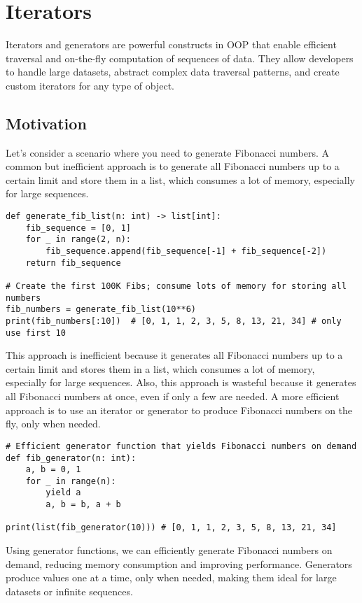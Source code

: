 \documentclass[oneside,11pt,dvipsnames]{book}
\begin{document}
\chapter{Iterators}
Iterators and generators are powerful constructs in OOP that enable efficient traversal and on-the-fly computation of sequences of data. They allow developers to handle large datasets, abstract complex data traversal patterns, and create custom iterators for any type of object. 

\section{Motivation}
Let’s consider a scenario where you need to generate Fibonacci numbers. A common but inefficient approach is to generate all Fibonacci numbers up to a certain limit and store them in a list, which consumes a lot of memory, especially for large sequences.

\begin{lstlisting}
def generate_fib_list(n: int) -> list[int]:
    fib_sequence = [0, 1]
    for _ in range(2, n):
        fib_sequence.append(fib_sequence[-1] + fib_sequence[-2])
    return fib_sequence

# Create the first 100K Fibs; consume lots of memory for storing all numbers
fib_numbers = generate_fib_list(10**6)  
print(fib_numbers[:10])  # [0, 1, 1, 2, 3, 5, 8, 13, 21, 34] # only use first 10
\end{lstlisting}

This approach is inefficient because it generates all Fibonacci numbers up to a certain limit and stores them in a list, which consumes a lot of memory, especially for large sequences. Also, this approach is wasteful because it generates all Fibonacci numbers at once, even if only a few are needed.
A more efficient approach is to use an iterator or generator to produce Fibonacci numbers on the fly, only when needed.

\begin{lstlisting}
# Efficient generator function that yields Fibonacci numbers on demand
def fib_generator(n: int):
    a, b = 0, 1
    for _ in range(n):
        yield a
        a, b = b, a + b

print(list(fib_generator(10))) # [0, 1, 1, 2, 3, 5, 8, 13, 21, 34]
\end{lstlisting}

Using generator functions, we can efficiently generate Fibonacci numbers on demand, reducing memory consumption and improving performance. Generators produce values one at a time, only when needed, making them ideal for large datasets or infinite sequences.
\end{document}
